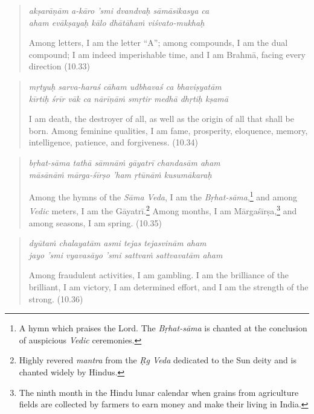 \documentclass[12pt, twoside, openright]{memoir}
\begin{document}
\par
\begin{verse}
\textit{akṣarāṇām a-kāro ’smi dvandvaḥ sāmāsikasya ca} \\
\textit{aham evākṣayaḥ kālo dhātāhaṁ viśvato-mukhaḥ}

\noindent Among letters, I am the letter \enquote{A}; among compounds, I am the dual compound; I am indeed imperishable time, and I am Brahmā, facing every direction (10.33)
\end{verse}
\par



\par
\begin{verse}
\textit{mṛtyuḥ sarva-haraś cāham udbhavaś ca bhaviṣyatām} \\
\textit{kīrtiḥ śrīr vāk ca nārīṇāṁ smṛtir medhā dhṛtiḥ kṣamā}

\noindent I am death, the destroyer of all, as well as the origin of all that shall be born. Among feminine qualities, I am fame, prosperity, eloquence, memory, intelligence, patience, and forgiveness. (10.34)
\end{verse}
\par



\par
\begin{verse}
\textit{bṛhat-sāma tathā sāmnāṁ gāyatrī chandasām aham} \\
\textit{māsānāṁ mārga-śīrṣo ’ham ṛtūnāṁ kusumākaraḥ}

\noindent Among the hymns of the \textit{Sāma Veda}, I am the \textit{Bṛhat-sāma},\footnote{A hymn which praises the Lord. The \textit{Bṛhat-sāma} is chanted at the conclusion of auspicious \textit{Vedic} ceremonies.} and among \textit{Vedic} meters, I am the Gāyatrī.\footnote{Highly revered \textit{mantra} from the \textit{Ṛg Veda} dedicated to the Sun deity and is chanted widely by Hindus.} Among months, I am Mārgaśīrṣa,\footnote{The ninth month in the Hindu lunar calendar when grains from agriculture fields are collected by farmers to earn money and make their living in India.} and among seasons, I am spring. (10.35)
\end{verse}
\par



\par
\begin{verse}
\textit{dyūtaṁ chalayatām asmi tejas tejasvinām aham} \\
\textit{jayo ’smi vyavasāyo ’smi sattvaṁ sattvavatām aham}

\noindent Among fraudulent activities, I am gambling. I am the brilliance of the brilliant, I am victory, I am determined effort, and I am the strength of the strong. (10.36)
\end{verse}
\par
\end{document}
